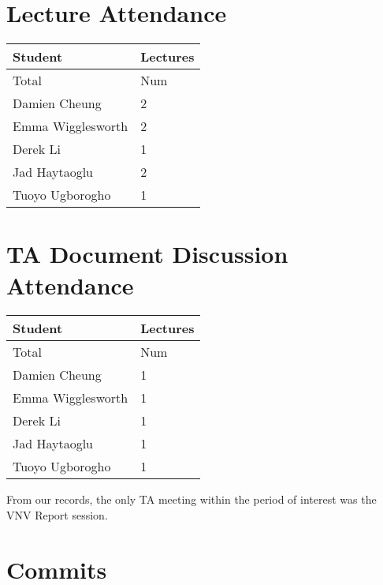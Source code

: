 \documentclass{article}
\begin{document}
\section{Lecture Attendance}


\begin{table}[H]
\centering
\begin{tabular}{ll}
\toprule
\textbf{Student} & \textbf{Lectures}\\
\midrule
Total & Num\\
Damien Cheung & 2\\
Emma Wigglesworth & 2\\
Derek Li & 1\\
Jad Haytaoglu & 2\\
Tuoyo Ugborogho & 1\\
\bottomrule
\end{tabular}
\end{table}

\section{TA Document Discussion Attendance}


\begin{table}[H]
\centering
\begin{tabular}{ll}
\toprule
\textbf{Student} & \textbf{Lectures}\\
\midrule
Total & Num\\
Damien Cheung & 1\\
Emma Wigglesworth & 1\\
Derek Li & 1\\
Jad Haytaoglu & 1\\
Tuoyo Ugborogho & 1\\
\bottomrule
\end{tabular}
\end{table}

From our records, the only TA meeting within the period of interest was the VNV Report session.

\section{Commits}
\end{document}
